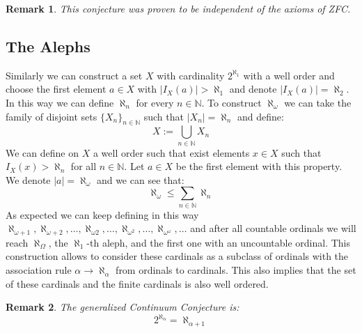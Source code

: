 \documentclass{article}
\newcommand{\N}{\mathbb{N}}
\theoremstyle{plain}
\newtheorem{remark}{Remark}[section]
\begin{document}
	\begin{remark}
		This conjecture was proven to be independent of the axioms of ZFC.
	\end{remark}
	
	\subsection{The Alephs}
	Similarly we can construct a set $X$ with cardinality $2^{\aleph_1}$ with a
	well order and choose the first element $a \in X$ with 
	$|I_X(a)| > \aleph_1$ and denote $|I_X(a)| = \aleph_2$. In this
	way we can define $\aleph_n$ for every $n \in \N$. To construct
	$\aleph_\omega$ we can take the family of disjoint sets 
	$\{X_n\}_{n \in \N}$ such that $|X_n| = \aleph_n$ and define:
	\[
		X := \bigcup_{n \in \N}{X_n}
	\]
	We can define on $X$ a well order such that exist elements $x \in X$
	such that $I_X(x) > \aleph_n$ for all $n \in \N$. Let $a \in X$ be
	the first element with this property. We denote $|a| = \aleph_\omega$ 
	and we can see that:
	\[
		\aleph_\omega \le \sum_{n\in\N}{\aleph_n}
	\]
	As expected we can keep defining in this way 
	$\aleph_{\omega+1}, \aleph_{\omega+2},\dots,\aleph_{\omega2},\dots,
	\aleph_{\omega^2},\dots,\aleph_{\omega^\omega},\dots$ and after all 
	countable ordinals we will reach $\aleph_\Omega$, the $\aleph_1$-th 
	aleph, and the first one with an uncountable ordinal. This construction
	allows to consider these cardinals as a subclass of ordinals with the
	association rule $\alpha \to \aleph_\alpha$ from ordinals to cardinals.
	This also implies that the set of these cardinals and the finite
	cardinals is also well ordered.
	
	\begin{remark}
		The generalized Continuum Conjecture is:
		\[
			2^{\aleph_\alpha}=\aleph_{\alpha+1}
		\]
	\end{remark}
	
	\newpage
	
\end{document}

